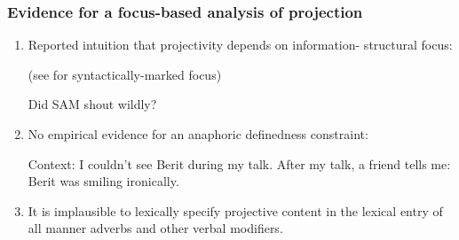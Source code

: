 \documentclass[pdf,xcolor=table,envcountsect,handout]{beamer}
\begin{document}
\begin{frame}
\frametitle{Evidence for a focus-based analysis of projection}

\begin{enumerate}

\item Reported intuition that projectivity depends on information- structural focus: \begin{tiny} (see \citealt{abrusan2013} for syntactically-marked focus) \end{tiny}

\begin{exe}
 Did SAM shout wildly?
\end{exe}

\medskip
\pause

\item No empirical evidence for an anaphoric definedness constraint:

\begin{exe}
 Context: I couldn't see Berit during my talk. After my talk, a friend tells me: \\ Berit was smiling ironically.
\end{exe}

\medskip
\pause

\item It is implausible to lexically specify projective content in the lexical entry of all manner adverbs and other verbal modifiers.

\medskip


\end{enumerate}

\end{frame}
\end{document}

